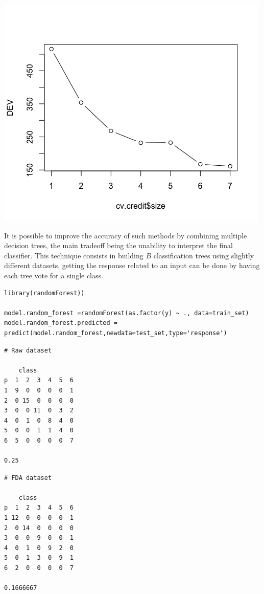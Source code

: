 \documentclass[]{report}
\begin{document}
    \begin{center}
 	\includegraphics[width=0.6\linewidth]{Figures/tree_fda_cv.png}
 	\label{fig:tree_fda_cv}
 \end{center}
 
 It is possible to improve the accuracy of such methods by combining multiple decision trees, the main tradeoff being the unability to interpret the final classifier. This technique consists in building $B$ classification trees using slightly different datasets, getting the response related to an input can be done by having each tree vote for a single class.
 
\begin{lstlisting}
library(randomForest))

model.random_forest =randomForest(as.factor(y) ~ ., data=train_set)
model.random_forest.predicted = predict(model.random_forest,newdata=test_set,type='response')
\end{lstlisting}

\begin{verbatim}
# Raw dataset

    class
p  1  2  3  4  5  6
1  9  0  0  0  0  1
2  0 15  0  0  0  0
3  0  0 11  0  3  2
4  0  1  0  8  4  0
5  0  0  1  1  4  0
6  5  0  0  0  0  7

0.25
\end{verbatim}

\begin{verbatim}
# FDA dataset

    class
p  1  2  3  4  5  6
1 12  0  0  0  0  1
2  0 14  0  0  0  0
3  0  0  9  0  0  1
4  0  1  0  9  2  0
5  0  1  3  0  9  1
6  2  0  0  0  0  7

0.1666667
\end{verbatim}
\end{document}
